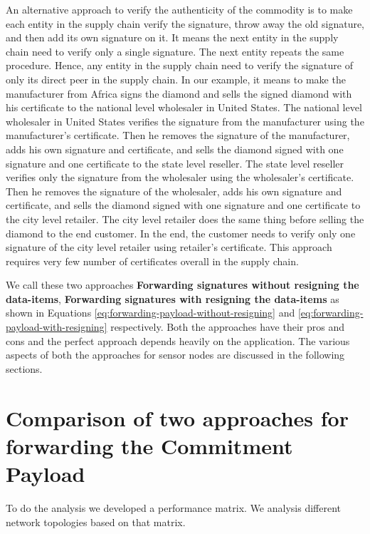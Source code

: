	An alternative approach to verify the authenticity of the commodity is to make each entity in the supply chain verify the signature, throw away the old signature, and then add its own signature on it. 
	It means the next entity in the supply chain need to verify only a single signature.
	The next entity repeats the same procedure.
	Hence, any entity in the supply chain need to verify the signature of only its direct peer in the supply chain. 
	In our example, it means to make the manufacturer from Africa signs the diamond and sells the signed diamond with his certificate to the national level wholesaler in United States.
	The national level wholesaler in United States verifies the signature from the manufacturer using the manufacturer's certificate.
	Then he removes the signature of the manufacturer, adds his own signature and certificate, and sells the diamond signed with one signature and one certificate to the state level reseller.
	The state level reseller verifies only the signature from the wholesaler using the wholesaler's certificate.
	Then he removes the signature of the wholesaler, adds his own signature and certificate, and sells the diamond signed with one signature and one certificate to the city level retailer.
	The city level retailer does the same thing before selling the diamond to the end customer.
	In the end, the customer needs to verify only one signature of the city level retailer using retailer's certificate.
	This approach requires very few number of certificates overall in the supply chain.

	We call these two approaches \textbf{Forwarding signatures without resigning the data-items}, \textbf{Forwarding signatures with resigning the data-items} as shown in Equations \ref{eq:forwarding-payload-without-resigning} and \ref{eq:forwarding-payload-with-resigning} respectively.
	Both the approaches have their pros and cons and the perfect approach depends heavily on the application.
	The various aspects of both the approaches for sensor nodes are discussed in the following sections.

	\section{Comparison of two approaches for forwarding the Commitment Payload}
		To do the analysis we developed a performance matrix. 
		We analysis different network topologies based on that matrix.

